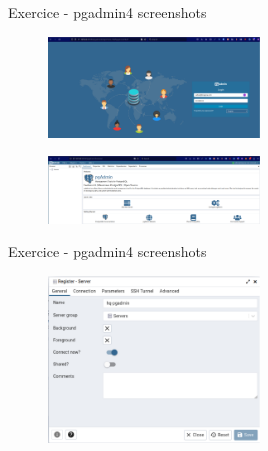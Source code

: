 \begin{frame}[fragile]{Exercice - pgadmin4 screenshots}

\begin{figure}
\begin{center}
\includegraphics[angle=0, width=0.5\textwidth]{images/pgadmin4_login.eps}
\end{center}
\end{figure}

\begin{figure}
\begin{center}
\includegraphics[angle=0, width=0.5\textwidth]{images/pgadmin4_home.eps}
\end{center}
\end{figure}

\end{frame}


\begin{frame}[fragile]{Exercice - pgadmin4 screenshots}

\begin{figure}
\begin{center}
\includegraphics[angle=0, width=0.5\textwidth]{images/pgadmin4_connexiondb.eps}
\end{center}
\end{figure}

\end{frame}

